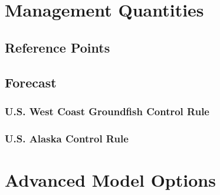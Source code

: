 \documentclass[11pt,
  english,
  letterpaper,
]{article}
\begin{document}
\leavevmode\tagmcend\tagstructend


\hypertarget{management-quantities}{%
\section{Management Quantities}\label{management-quantities}}

\leavevmode\tagmcend\tagstructend


\hypertarget{reference-points}{%
\subsection{Reference Points}\label{reference-points}}

\leavevmode\tagmcend\tagstructend


\hypertarget{forecast}{%
\subsection{Forecast}\label{forecast}}

\leavevmode\tagmcend\tagstructend


\hypertarget{u.s.-west-coast-groundfish-control-rule}{%
\subsubsection{U.S. West Coast Groundfish Control Rule}\label{u.s.-west-coast-groundfish-control-rule}}

\leavevmode\tagmcend\tagstructend


\hypertarget{u.s.-alaska-control-rule}{%
\subsubsection{U.S. Alaska Control Rule}\label{u.s.-alaska-control-rule}}

\leavevmode\tagmcend\tagstructend


\hypertarget{advanced-model-options}{%
\section{Advanced Model Options}\label{advanced-model-options}}
\end{document}

